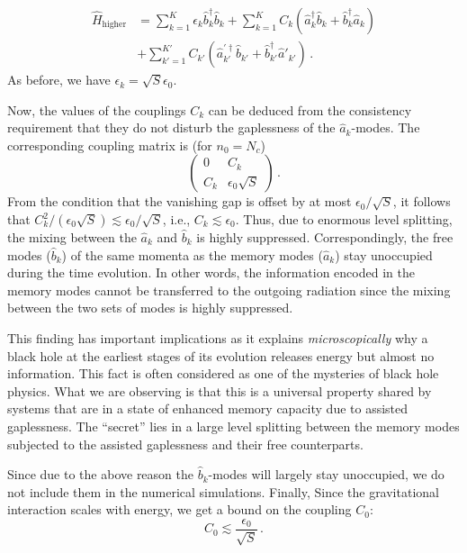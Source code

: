 \documentclass[aps,prd,reprint,superscriptaddress,nofootinbib]{revtex4-2}
\newcommand*{\ie}{i.e., }
\begin{document}
\begin{align}
\hat{H}_{\text{higher}} &=\sum_{k=1}^{K} \epsilon_k \hat{b}_k^\dagger 
\hat{b}_k +  \sum_{k=1}^{K} C_k \left(\hat{a}_k^\dagger \hat{b}_k + \hat{b}_k^\dagger \hat{a}_k\right) 
\nonumber \\
&+  \sum_{k'=1}^{K'} C_{k'} \left(\hat{a}_{k'}^{'\dagger} \hat{b}_{k'} + \hat{b}_{k'}^\dagger \hat{a}'_{k'}\right) \,.
\end{align}
As before, we have $\epsilon_k=\sqrt{S}\epsilon_0$. 


Now, the values of the couplings $C_k$ can be deduced from the 
consistency requirement that they do not disturb the gaplessness of the $\hat{a}_k$-modes. The corresponding coupling matrix is (for $n_0=N_c$) 
\begin{equation}
\begin{pmatrix}
0 & C_k\\
C_k & \epsilon_0\sqrt{S} 
\end{pmatrix}\,.
\end{equation}
From the condition that the vanishing gap is offset by at most $\epsilon_0/\sqrt{S}$, it follows that $C_k^2/(\epsilon_0\sqrt{S}) \lesssim \epsilon_0/\sqrt{S}$, \ie $C_k \lesssim \epsilon_0$.
Thus, due to enormous level splitting,  the mixing between the 
$\hat{a}_k$ and  $\hat{b}_k$ is highly suppressed. 
Correspondingly, the free modes ($\hat{b}_k$)
 of the same momenta as the memory 
modes ($\hat{a}_k$) stay unoccupied during the time evolution.  
In other words, the information encoded in the memory modes 
cannot be transferred to the outgoing radiation since the mixing 
between the two sets of modes is highly suppressed. 

This finding has important implications as it explains 
{\it microscopically} \cite{1810.02336}  why a black hole at the earliest 
stages of its evolution 
releases energy but almost no information. 
This fact is often considered as one of the mysteries 
of black hole physics. 
What we are observing is that this is a universal property 
shared by systems that are in a state of enhanced memory capacity due to
assisted gaplessness. The ``secret'' lies in a large level splitting between 
the memory modes subjected to the assisted gaplessness and 
their free counterparts. 

Since due to the above reason the $\hat{b}_k$-modes will largely stay unoccupied, we do not include them in the numerical simulations. 
Finally,  Since the gravitational interaction scales with energy, 
 we get a bound on the coupling $C_0$:
\begin{equation} \label{boundC0}
C_0 \lesssim \frac{\epsilon_0}{\sqrt{S}} \,.
\end{equation}
\end{document}

